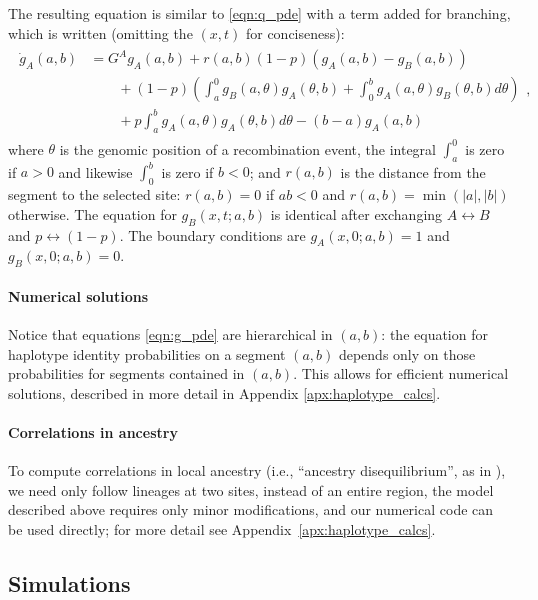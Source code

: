\documentclass[11pt,letterpaper]{article}
\begin{document}
The resulting equation is similar to \eqref{eqn:q_pde} with a term added for branching,
which is written (omitting the $(x,t)$ for conciseness):
\begin{align}
    \begin{aligned} \label{eqn:g_pde}
        \dot g_A(a,b) 
        &= G^A g_A(a,b) + r(a,b) (1-p) (g_A(a,b)-g_B(a,b))
            \\ {} & \qquad 
            + (1-p) \left( \int_a^0 
                g_B(a,\theta) g_A(\theta,b)
                + \int_0^b g_A(a,\theta) g_B(\theta,b)
            d\theta \right)
            \\ {} & \qquad 
            + p \int_a^b {
                g_A(a,\theta) g_A(\theta,b) 
            } d\theta
            - (b-a) g_A(a,b)  
    \end{aligned} ,
\end{align}
where $\theta$ is the genomic position of a recombination event, 
the integral $\int_a^0$ is zero if $a>0$ and likewise $\int_0^b$ is zero if $b<0$;
and $r(a,b)$ is the distance from the segment to the selected site:
$r(a,b)=0$ if $ab<0$ and $r(a,b)=\min(|a|,|b|)$ otherwise.
The equation for $g_B(x,t;a,b)$ is identical after exchanging $A \leftrightarrow B$ and
$p \leftrightarrow (1-p)$.
The boundary conditions are $g_A(x,0;a,b)=1$ and $g_B(x,0;a,b)=0$.

\paragraph{Numerical solutions}
Notice that equations \eqref{eqn:g_pde}
are hierarchical in $(a,b)$:
the equation for haplotype identity probabilities on a segment $(a,b)$ depends only on those probabilities for segments contained in $(a,b)$.
This allows for efficient numerical solutions,
described in more detail in Appendix \ref{apx:haplotype_calcs}.


\paragraph{Correlations in ancestry}
To compute correlations in local ancestry
(i.e., ``ancestry disequilibrium'', as in \citet{Pool2015,Schumer2016}),
we need only follow lineages at two sites, instead of an entire region,
the model described above requires only minor modifications,
and our numerical code can be used directly;
for more detail see Appendix~\ref{apx:haplotype_calcs}.


\subsection*{Simulations}
\end{document}
